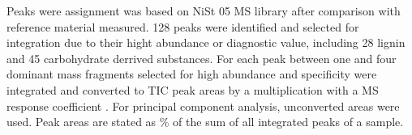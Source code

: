 \documentclass[authoryear,preprint,review,12pt]{elsarticle}
\begin{document}
                                                                                                                                                                                                                                                                                                                                                                                                                                                                                                                                                                                                                                                                                                                                                                                                                                                                                                                                                                                                                                                                                                                              Peaks were assignment was based on NiSt 05 MS library after comparison with reference material measured. 128 peaks were identified and selected for integration due to their hight abundance or diagnostic value, including 28 lignin and 45 carbohydrate derrived substances. For each peak between one and four dominant mass fragments selected for high abundance and specificity were integrated and converted to TIC peak areas by a multiplication with a MS response coefficient \citep{Schellekens2009, Kuder1998}. For principal component analysis, unconverted areas were used. Peak areas are stated as \% of the sum of all integrated peaks of a sample.
\end{document}
